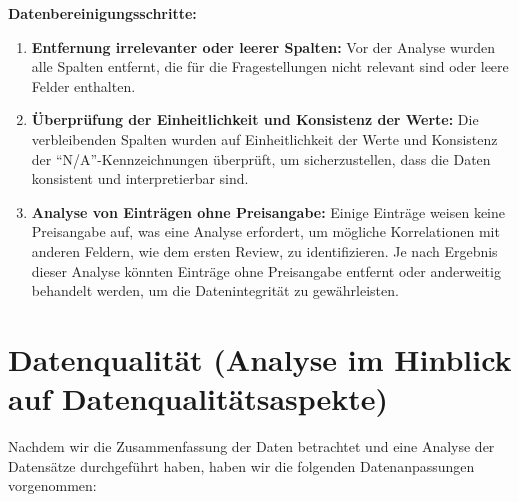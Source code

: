 \documentclass[
  journal,
]{IEEEtran}%
\begin{document}
\textbf{Datenbereinigungsschritte:}

\begin{enumerate}
\def\labelenumi{\arabic{enumi}.}
\item
  \textbf{Entfernung irrelevanter oder leerer Spalten:} Vor der Analyse
  wurden alle Spalten entfernt, die für die Fragestellungen nicht
  relevant sind oder leere Felder enthalten.
\item
  \textbf{Überprüfung der Einheitlichkeit und Konsistenz der Werte:} Die
  verbleibenden Spalten wurden auf Einheitlichkeit der Werte und
  Konsistenz der ``N/A''-Kennzeichnungen überprüft, um sicherzustellen,
  dass die Daten konsistent und interpretierbar sind.
\item
  \textbf{Analyse von Einträgen ohne Preisangabe:} Einige Einträge
  weisen keine Preisangabe auf, was eine Analyse erfordert, um mögliche
  Korrelationen mit anderen Feldern, wie dem ersten Review, zu
  identifizieren. Je nach Ergebnis dieser Analyse könnten Einträge ohne
  Preisangabe entfernt oder anderweitig behandelt werden, um die
  Datenintegrität zu gewährleisten.
\end{enumerate}

\hypertarget{datenqualituxe4t-analyse-im-hinblick-auf-datenqualituxe4tsaspekte}{%
\section{Datenqualität (Analyse im Hinblick auf
Datenqualitätsaspekte)}\label{datenqualituxe4t-analyse-im-hinblick-auf-datenqualituxe4tsaspekte}}

Nachdem wir die Zusammenfassung der Daten betrachtet und eine Analyse
der Datensätze durchgeführt haben, haben wir die folgenden
Datenanpassungen vorgenommen:
\end{document}
